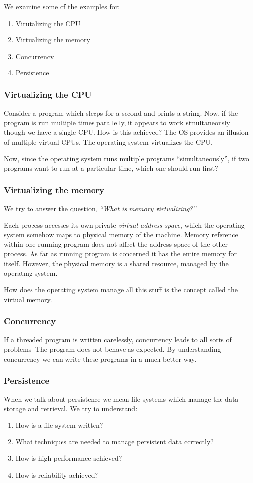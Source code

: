 \documentclass[10pt]{article}
\begin{document}
We examine some of the examples for:
\begin{enumerate}
  \item Virutalizing the CPU
  \item Virtualizing the memory
  \item Concurrency
  \item Persistence
\end{enumerate}

\subsubsection*{Virtualizing the CPU}
Consider a program which sleeps for a second and prints a string. Now, if the
program is run multiple times parallelly, it appears to work simultaneously
though we have a single CPU. How is this achieved? The OS provides an illusion
of multiple virtual CPUs. The operating system virtualizes the CPU.

Now, since the operating system runs multiple programs ``simultaneously'', if
two programs want to run at a particular time, which one should run first?

\subsubsection*{Virtualizing the memory}
We try to answer the question, \emph{``What is memory virtualizing?''}

Each process accesses its own private \emph{virtual address space}, which the
operating system somehow maps to physical memory of the machine. Memory
reference within one running program does not affect the address space of the
other process. As far as running program is concerned it has the entire memory
for itself. However, the physical memory is a shared resource, managed by the
operating system.

How does the operating system manage all this stuff is the concept called the
virtual memory.

\subsubsection*{Concurrency}
If a threaded program is written carelessly, concurrency leads to all sorts of
problems. The program does not behave as expected. By understanding concurrency
we can write these programs in a much better way.

\subsubsection*{Persistence}
When we talk about persistence we mean file systems which manage the data storage
and retrieval. We try to understand:
\begin{enumerate}
\item How is a file system written?
\item What techniques are needed to manage persistent data correctly?
\item How is high performance achieved?
\item How is reliability achieved?
\end{enumerate}
\end{document}
